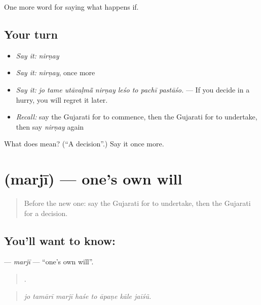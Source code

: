 \begin{grammarlens}[title={What you've built}]
One more word for saying what happens if.
\end{grammarlens}

\subsection*{Your turn}
\begin{itemize}
\raggedright
  \item \emph{Say it:} \emph{nirṇay}
  \item \emph{Say it:} \emph{nirṇay}, once more
  \item \emph{Say it:} \emph{jo tame utāvaḷmā̃ nirṇay leśo to pachī pastāśo.} — If you decide in a hurry, you will regret it later.
  \item \emph{Recall:} say the Gujarati for to commence, then the Gujarati for to undertake, then say \emph{nirṇay} again
\end{itemize}

\begin{tcolorbox}[breakable,colback=teal!4,colframe=teal!35!black,title={Before you move on}]
What does  mean? (\textquotedblleft{}A decision\textquotedblright{}.) Say it once more.
\end{tcolorbox}
\section[\texorpdfstring{\gu{મરજી} (marjī)}{મરજી (marjī)}]{ (marjī) — one's own will}

\label{lesson:GU-C389-marji}



\begin{quote}
Before the new one: say the Gujarati for to undertake, then the Gujarati for a decision.
\end{quote}

\subsection*{You'll want to know: }
\textbf{} — \emph{marjī} — \textquotedblleft{}one's own will\textquotedblright{}.

\begin{quote}
       .
\end{quote}

\begin{quote}
\emph{jo tamārī marjī haśe to āpaṇe kāle jaīśũ.}
\end{quote}

